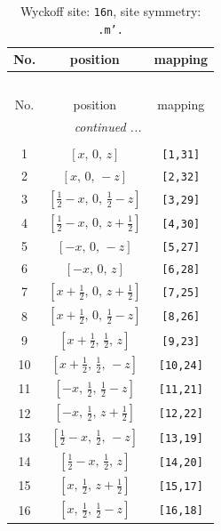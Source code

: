 \documentclass[fleqn,8pt]{jsarticle}
\begin{document}
\renewcommand{\arraystretch}{1.2}
\begin{longtable}{ccc}
\caption{Wyckoff site: {\tt 16n}, site symmetry: {\tt .m'.}}
 \\
 \hline \hline
No. & position & mapping \\ \hline \endfirsthead

\multicolumn{2}{l}{\tablename\ \thetable{}} \\
 \hline \hline
No. & position & mapping \\ \hline \endhead

 \hline \hline
\multicolumn{2}{r}{\footnotesize\it continued ...} \\ \endfoot

 \hline \hline
\multicolumn{2}{r}{} \\ \endlastfoot

1 & $\left[ x,\, 0,\, z \right]$ & {\tt [1,31]} \\ \hline
2 & $\left[ x,\, 0,\, - z \right]$ & {\tt [2,32]} \\ \hline
3 & $\left[ \frac{1}{2} - x,\, 0,\, \frac{1}{2} - z \right]$ & {\tt [3,29]} \\ \hline
4 & $\left[ \frac{1}{2} - x,\, 0,\, z + \frac{1}{2} \right]$ & {\tt [4,30]} \\ \hline
5 & $\left[ - x,\, 0,\, - z \right]$ & {\tt [5,27]} \\ \hline
6 & $\left[ - x,\, 0,\, z \right]$ & {\tt [6,28]} \\ \hline
7 & $\left[ x + \frac{1}{2},\, 0,\, z + \frac{1}{2} \right]$ & {\tt [7,25]} \\ \hline
8 & $\left[ x + \frac{1}{2},\, 0,\, \frac{1}{2} - z \right]$ & {\tt [8,26]} \\ \hline
9 & $\left[ x + \frac{1}{2},\, \frac{1}{2},\, z \right]$ & {\tt [9,23]} \\ \hline
10 & $\left[ x + \frac{1}{2},\, \frac{1}{2},\, - z \right]$ & {\tt [10,24]} \\ \hline
11 & $\left[ - x,\, \frac{1}{2},\, \frac{1}{2} - z \right]$ & {\tt [11,21]} \\ \hline
12 & $\left[ - x,\, \frac{1}{2},\, z + \frac{1}{2} \right]$ & {\tt [12,22]} \\ \hline
13 & $\left[ \frac{1}{2} - x,\, \frac{1}{2},\, - z \right]$ & {\tt [13,19]} \\ \hline
14 & $\left[ \frac{1}{2} - x,\, \frac{1}{2},\, z \right]$ & {\tt [14,20]} \\ \hline
15 & $\left[ x,\, \frac{1}{2},\, z + \frac{1}{2} \right]$ & {\tt [15,17]} \\ \hline
16 & $\left[ x,\, \frac{1}{2},\, \frac{1}{2} - z \right]$ & {\tt [16,18]} \\
\end{longtable}
\end{document}
